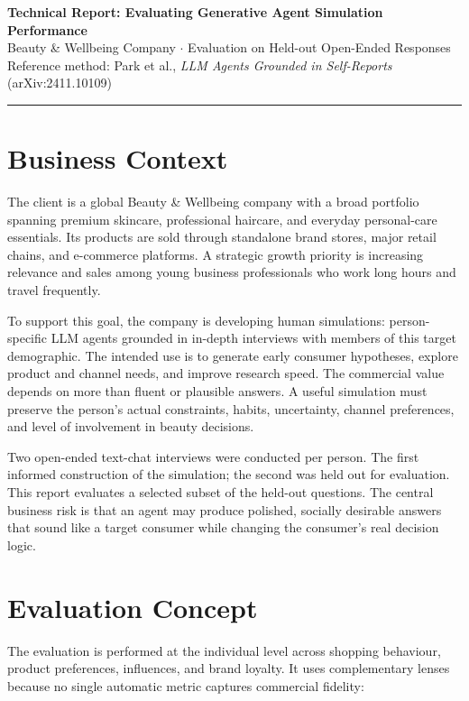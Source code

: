 \documentclass[10pt,a4paper]{article}
\begin{document}
{\large\bfseries\color{primary} Technical Report: Evaluating Generative Agent Simulation Performance}\\[2pt]
{\small Beauty \& Wellbeing Company $\cdot$ Evaluation on Held-out Open-Ended Responses}\\[1pt]
{\scriptsize Reference method: Park et al., \textit{LLM Agents Grounded in Self-Reports} (arXiv:2411.10109)}\\[-2pt]
{\color{primary}\rule{\textwidth}{0.8pt}}

\section{Business Context}

The client is a global Beauty \& Wellbeing company with a broad portfolio spanning premium skincare, professional haircare, and everyday personal-care essentials. Its products are sold through standalone brand stores, major retail chains, and e-commerce platforms. A strategic growth priority is increasing relevance and sales among young business professionals who work long hours and travel frequently.

To support this goal, the company is developing human simulations: person-specific LLM agents grounded in in-depth interviews with members of this target demographic. The intended use is to generate early consumer hypotheses, explore product and channel needs, and improve research speed. The commercial value depends on more than fluent or plausible answers. A useful simulation must preserve the person's actual constraints, habits, uncertainty, channel preferences, and level of involvement in beauty decisions.

Two open-ended text-chat interviews were conducted per person. The first informed construction of the simulation; the second was held out for evaluation. This report evaluates a selected subset of the held-out questions. The central business risk is that an agent may produce polished, socially desirable answers that sound like a target consumer while changing the consumer's real decision logic.

\section{Evaluation Concept}

The evaluation is performed at the individual level across shopping behaviour, product preferences, influences, and brand loyalty. It uses complementary lenses because no single automatic metric captures commercial fidelity:
\end{document}
